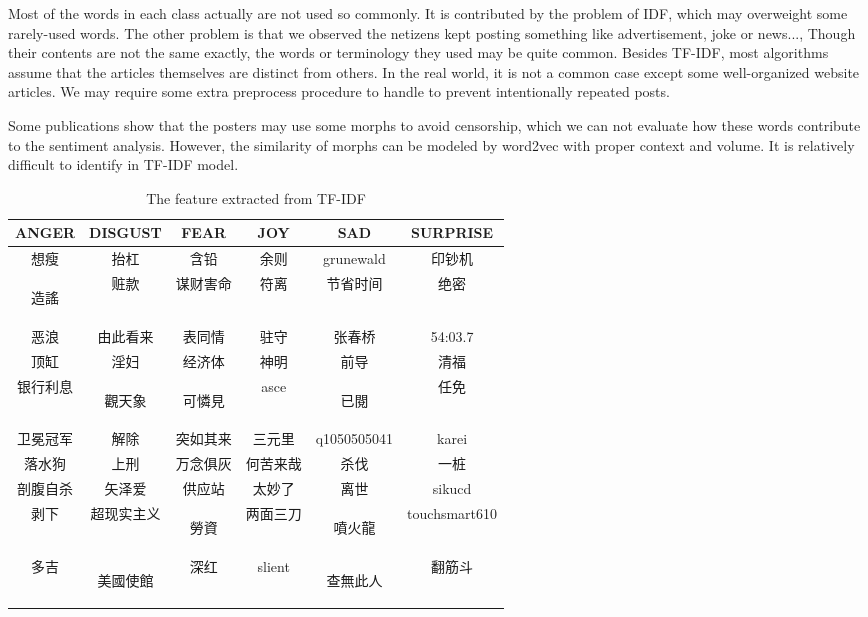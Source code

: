 Most of the words in each class actually are not used so commonly. It is contributed by the problem of IDF, which may overweight some rarely-used words.
The other problem is that we observed the netizens kept posting something like advertisement, joke or news..., 
Though their contents are not the same exactly, the words or terminology they used may be quite common. 
Besides TF-IDF, most algorithms assume that the articles themselves are distinct from others. In the real world, it is not a common case except some well-organized website articles.
We may require some extra preprocess procedure to handle to prevent intentionally repeated posts.

Some publications\cite{Chen2013TUP25129382512940} show that the posters may use some morphs to avoid censorship, which we can not evaluate how these words contribute to the sentiment analysis. 
However, the similarity of morphs can be modeled by word2vec with proper context and volume. 
It is relatively difficult to identify in TF-IDF model. 
\begin{CJK}{UTF8}{gbsn}
\begin{table}[]
\centering
\caption{The feature extracted from TF-IDF}
\label{table:featureoftfidf}
\begin{tabular}{|c|c|c|c|c|c|}
ANGER	& DISGUST	& FEAR	& JOY	& SAD	& SURPRISE \\
\hline
想瘦	&抬杠	&含铅	&余则	&grunewald	&印钞机 \\
\begin{CJK}{UTF8}{bkai}造謠\end{CJK}	&赃款	&谋财害命	&符离	&节省时间	&绝密\\
恶浪	&由此看来	&表同情	&驻守	&张春桥	&54:03.7\\
顶缸	&淫妇	&经济体	&神明	&前导	&清福\\
银行利息	&\begin{CJK}{UTF8}{bkai}觀天象\end{CJK}	&\begin{CJK}{UTF8}{bkai}可憐見\end{CJK}	&asce	&\begin{CJK}{UTF8}{bkai}已閱\end{CJK}	&任免\\
卫冕冠军	&解除	&突如其来	&三元里	&q1050505041	&karei\\
落水狗	&上刑	&万念俱灰	&何苦来哉	&杀伐	&一桩\\
剖腹自杀	&矢泽爱	&供应站	&太妙了	&离世	&sikucd\\
剥下	&超现实主义	&\begin{CJK}{UTF8}{bkai}勞資\end{CJK}	&两面三刀	&\begin{CJK}{UTF8}{bkai}噴火龍\end{CJK}	&touchsmart610\\
多吉	&\begin{CJK}{UTF8}{bkai}美國使館\end{CJK}	&深红	&slient	&\begin{CJK}{UTF8}{bkai}查無此人\end{CJK}	&翻筋斗
\end{tabular}
\end{table}
\end{CJK}

